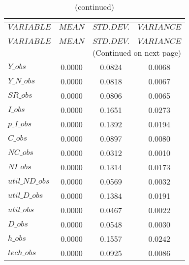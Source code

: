  
\begin{center}
\begin{longtable}{lccc} 
\caption{THEORETICAL MOMENTS}\\
 \label{Table:th_moments}\\
\toprule 
$VARIABLE       $	 & 	 $         MEAN$	 & 	 $    STD. DEV.$	 & 	 $     VARIANCE$\\
\midrule \endfirsthead 
\caption{(continued)}\\
 \toprule \\ 
$VARIABLE       $	 & 	 $         MEAN$	 & 	 $    STD. DEV.$	 & 	 $     VARIANCE$\\
\midrule \endhead 
\midrule \multicolumn{4}{r}{(Continued on next page)} \\ \bottomrule \endfoot 
\bottomrule \endlastfoot 
$Y\_obs         $	 & 	       0.0000	 & 	       0.0824	 & 	       0.0068 \\ 
$Y\_N\_obs      $	 & 	       0.0000	 & 	       0.0818	 & 	       0.0067 \\ 
$SR\_obs        $	 & 	       0.0000	 & 	       0.0806	 & 	       0.0065 \\ 
$I\_obs         $	 & 	       0.0000	 & 	       0.1651	 & 	       0.0273 \\ 
$p\_I\_obs      $	 & 	       0.0000	 & 	       0.1392	 & 	       0.0194 \\ 
$C\_obs         $	 & 	       0.0000	 & 	       0.0897	 & 	       0.0080 \\ 
$NC\_obs        $	 & 	       0.0000	 & 	       0.0312	 & 	       0.0010 \\ 
$NI\_obs        $	 & 	       0.0000	 & 	       0.1314	 & 	       0.0173 \\ 
$util\_ND\_obs  $	 & 	       0.0000	 & 	       0.0569	 & 	       0.0032 \\ 
$util\_D\_obs   $	 & 	       0.0000	 & 	       0.1384	 & 	       0.0191 \\ 
$util\_obs      $	 & 	       0.0000	 & 	       0.0467	 & 	       0.0022 \\ 
$D\_obs         $	 & 	       0.0000	 & 	       0.0548	 & 	       0.0030 \\ 
$h\_obs         $	 & 	       0.0000	 & 	       0.1557	 & 	       0.0242 \\ 
$tech\_obs      $	 & 	       0.0000	 & 	       0.0925	 & 	       0.0086 \\ 
\end{longtable}
 \end{center}
